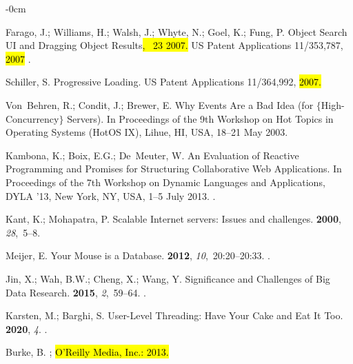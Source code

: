 \documentclass[software,article,accept,pdftex,moreauthors]{Definitions/mdpi}
\begin{document}
\begin{adjustwidth}{-\extralength}{0cm}
\begin{thebibliography}{999}
Farago, J.; Williams, H.; Walsh, J.; Whyte, N.; Goel, K.; Fung, P.
\newblock Object Search UI and Dragging Object Results\hl{,  ~23 2007.} %
\newblock US Patent Applications 11/353,787, \hl{2007}%
.

Schiller, S.
\newblock Progressive Loading.
\newblock US Patent Applications 11/364,992, \hl{2007.} %


Von~Behren, R.; Condit, J.; Brewer, E.
\newblock Why Events Are a Bad Idea (for $\{$High-Concurrency$\}$ Servers).
\newblock In Proceedings of the 9th Workshop on Hot Topics in Operating Systems
  (HotOS IX), Lihue, HI, USA, 18–21 May 2003.

Kambona, K.; Boix, E.G.; De~Meuter, W.
\newblock An Evaluation of Reactive Programming and Promises for Structuring
  Collaborative Web Applications.
\newblock In Proceedings of the 7th Workshop on Dynamic
  Languages and Applications, DYLA '13, New York, NY, USA, 1–5 July 2013.
.

Kant, K.; Mohapatra, P.
\newblock Scalable Internet servers: Issues and challenges.
 {\bf 2000}, {\em
  28},~5--8.

Meijer, E.
\newblock Your Mouse is a Database.
 {\bf 2012}, {\em 10},~20:20--20:33.
.

Jin, X.; Wah, B.W.; Cheng, X.; Wang, Y.
\newblock Significance and Challenges of Big Data Research.
 {\bf 2015}, {\em 2},~59--64.
.

Karsten, M.; Barghi, S.
\newblock User-Level Threading: Have Your Cake and Eat It Too.
 {\bf 2020}, {\em 4}.
.

Burke, B.
; \hl{O'Reilly Media, Inc.: 2013.} %



\end{thebibliography}
\end{adjustwidth}
\end{document}
